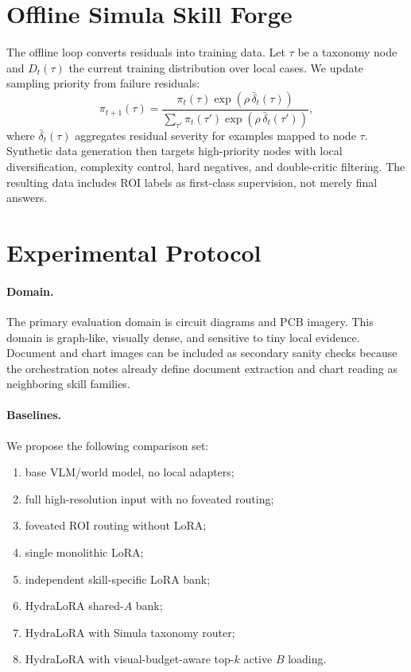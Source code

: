 \documentclass[11pt]{article}
\begin{document}
\section{Offline Simula Skill Forge}

The offline loop converts residuals into training data.
Let $\tau$ be a taxonomy node and $D_t(\tau)$ the current training distribution over local cases.
We update sampling priority from failure residuals:
\begin{equation}
  \pi_{t+1}(\tau)
  =
  \frac{
  \pi_t(\tau)\exp(\rho\,\bar\delta_t(\tau))
  }{
  \sum_{\tau'}\pi_t(\tau')\exp(\rho\,\bar\delta_t(\tau'))
  },
  \label{eq:curriculum}
\end{equation}
where $\bar\delta_t(\tau)$ aggregates residual severity for examples mapped to node $\tau$.
Synthetic data generation then targets high-priority nodes with local diversification, complexity control, hard negatives, and double-critic filtering.
The resulting data includes ROI labels as first-class supervision, not merely final answers.

\section{Experimental Protocol}

\paragraph{Domain.}
The primary evaluation domain is circuit diagrams and PCB imagery.
This domain is graph-like, visually dense, and sensitive to tiny local evidence.
Document and chart images can be included as secondary sanity checks because the orchestration notes already define document extraction and chart reading as neighboring skill families.

\paragraph{Baselines.}
We propose the following comparison set:
\begin{enumerate}[leftmargin=*]
  \item base VLM/world model, no local adapters;
  \item full high-resolution input with no foveated routing;
  \item foveated ROI routing without LoRA;
  \item single monolithic LoRA;
  \item independent skill-specific LoRA bank;
  \item HydraLoRA shared-$A$ bank;
  \item HydraLoRA with Simula taxonomy router;
  \item HydraLoRA with visual-budget-aware top-$k$ active $B$ loading.
\end{enumerate}
\end{document}
